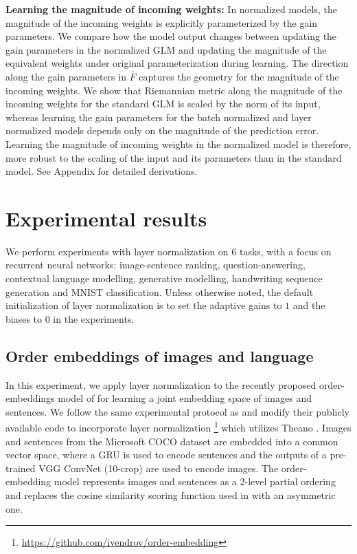 {\textbf{Learning the magnitude of incoming weights:}} In normalized models, the magnitude of the incoming weights is explicitly parameterized by the gain parameters. We compare how the model output changes between updating the gain parameters in the normalized GLM and updating the magnitude of the equivalent weights under original parameterization during learning. The direction along the gain parameters in $\bar{F}$ captures the geometry for the magnitude of the incoming weights.  We show that Riemannian metric along the magnitude of the incoming weights for the standard GLM is scaled by the norm of its input, whereas learning the gain parameters for the batch normalized and layer normalized models depends only on the magnitude of the prediction error.  Learning the magnitude of incoming weights in the normalized model is therefore, more robust to the scaling of the input and its parameters than in the standard model. See Appendix for detailed derivations. 

\section{Experimental results}
\label{sec:exp}

We perform experiments with layer normalization on 6 tasks, with a focus on recurrent neural networks: image-sentence ranking, question-answering, contextual language modelling, generative modelling, handwriting sequence generation and MNIST classification. Unless otherwise noted, the default initialization of layer normalization is to set the adaptive gains to $1$ and the biases to $0$ in the experiments. 

\subsection{Order embeddings of images and language}

In this experiment, we apply layer normalization to the recently proposed order-embeddings model of \citet{vendrov2015order} for learning a joint embedding space of images and sentences. We follow the same experimental protocol as \citet{vendrov2015order} and modify their publicly available code to incorporate layer normalization \footnote{\url{https://github.com/ivendrov/order-embedding}} which utilizes Theano \citep{team2016theano}. Images and sentences from the Microsoft COCO dataset \citep{lin2014microsoft} are embedded into a common vector space, where a GRU \citep{cho2014learning} is used to encode sentences and the outputs of a pre-trained VGG ConvNet \citep{simonyan2014very} (10-crop) are used to encode images. The order-embedding model represents images and sentences as a 2-level partial ordering and replaces the cosine similarity scoring function used in \citet{kiros2014unifying} with an asymmetric one.


